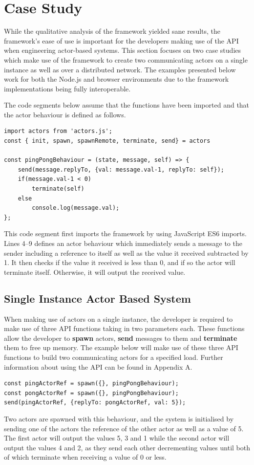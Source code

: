 \documentclass[oneside]{um-fict}
\begin{document}
\section{Case Study}
While the qualitative analysis of the framework yielded sane results, the framework's ease of use is important for the developers making use of the API when engineering actor-based systems. This section focuses on two case studies which make use of the framework to create two communicating actors on a single instance as well as over a distributed network. The examples presented below work for both the Node.js and browser environments due to the framework implementations being fully interoperable.

The code segments below assume that the functions have been imported and that the actor behaviour is defined as follows.
\begin{lstlisting}    
import actors from 'actors.js';
const { init, spawn, spawnRemote, terminate, send} = actors

const pingPongBehaviour = (state, message, self) => {
    send(message.replyTo, {val: message.val-1, replyTo: self});
    if(message.val-1 < 0)
        terminate(self)
    else    
        console.log(message.val);
};
\end{lstlisting}
This code segment first imports the framework by using JavaScript ES6 imports. Lines 4--9 defines an actor behaviour which immediately sends a message to the sender including a reference to itself as well as the value it received subtracted by 1. It then checks if the value it received is less than 0, and if so the actor will terminate itself. Otherwise, it will output the received value. 
\subsection{Single Instance Actor Based System}
When making use of actors on a single instance, the developer is required to make use of three API functions taking in two parameters each. These functions allow the developer to \textbf{spawn} actors, \textbf{send} messages to them and \textbf{terminate} them to free up memory. The example below will make use of these three API functions to build two communicating actors for a specified load. Further information about using the API can be found in Appendix A.
\begin{lstlisting}    
const pingActorRef = spawn({}, pingPongBehaviour);
const pongActorRef = spawn({}, pingPongBehaviour);
send(pingActorRef, {replyTo: pongActorRef, val: 5});
\end{lstlisting}
Two actors are spawned with this behaviour, and the system is initialised by sending one of the actors the reference of the other actor as well as a value of 5. The first actor will output the values 5, 3 and 1 while the second actor will output the values 4 and 2, as they send each other decrementing values until both of which terminate when receiving a value of 0 or less.
\end{document}
